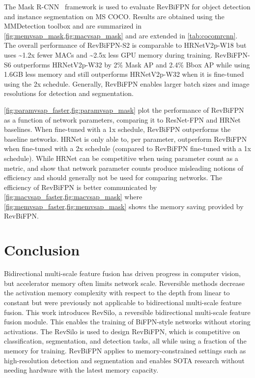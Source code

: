 \documentclass{article}
\begin{document}
The Mask R-CNN~\cite{he2017mask} framework is used to evaluate RevBiFPN for object detection and instance segmentation on MS COCO.
Results are obtained using the MMDetection toolbox and are summarized in \cref{fig:memvsap_mask,fig:macvsap_mask} and are extended in \cref{tab:cocomrcnn}. 
The overall performance of RevBiFPN-S2 is comparable to HRNetV2p-W18 but uses \textasciitilde1.2x fewer MACs and \textasciitilde2.5x less GPU memory during training. 
RevBiFPN-S6 outperforms HRNetV2p-W32 by 2\% Mask AP and 2.4\% Bbox AP while using 1.6GB less memory and still outperforms HRNetV2p-W32 when it is fine-tuned using the 2x schedule.
Generally, RevBiFPN enables larger batch sizes and image resolutions for detection and segmentation.

\cref{fig:paramvsap_faster,fig:paramvsap_mask} plot the performance of RevBiFPN as a function of network parameters, comparing it to ResNet-FPN and HRNet baselines.
When fine-tuned with a 1x schedule, RevBiFPN outperforms the baseline networks.
HRNet is only able to, per parameter, outperform RevBiFPN when fine-tuned with a 2x schedule (compared to RevBiFPN fine-tuned with a 1x schedule).
While HRNet can be competitive when using parameter count as a metric, \citet{dehghani2021efficiency} and \citet{mehta2021mobilevit} show that network parameter counts produce misleading notions of efficiency and should generally not be used for comparing networks.
The efficiency of RevBiFPN is better communicated by \cref{fig:macvsap_faster,fig:macvsap_mask} where \cref{fig:memvsap_faster,fig:memvsap_mask} shows the memory saving provided by RevBiFPN.

\section{Conclusion}
\label{sec:conclusion}
Bidirectional multi-scale feature fusion has driven progress in computer vision, but accelerator memory often limits network scale.
Reversible methods decrease the activation memory complexity with respect to the depth from linear to constant but were previously not applicable to bidirectional multi-scale feature fusion.
This work introduces RevSilo, a reversible bidirectional multi-scale feature fusion module.
This enables the training of BiFPN-style networks without storing activations.
The RevSilo is used to design RevBiFPN, which is competitive on classification, segmentation, and detection tasks, all while using a fraction of the memory for training.
RevBiFPN applies to memory-constrained settings such as high-resolution detection and segmentation and enables SOTA research without needing hardware with the latest memory capacity.
\end{document}
